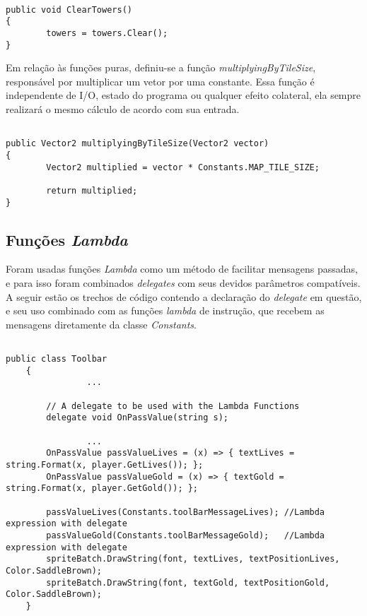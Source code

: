 \documentclass[rel_mlp]{iiufrgs}
\begin{document}
\begin{lstlisting}[caption=Trecho de código C\# retirado da implementação deste trabalho, label=lst:test]

public void ClearTowers()
{
		towers = towers.Clear();
}

\end{lstlisting}

Em relação às funções puras, definiu-se a função \textit{multiplyingByTileSize}, responsável por multiplicar um vetor por uma constante. Essa função é independente de I/O, estado do programa ou qualquer efeito colateral, ela sempre realizará o mesmo cálculo de acordo com sua entrada.

\begin{lstlisting}[caption=Trecho de código C\# retirado da implementação deste trabalho, label=lst:test]

public Vector2 multiplyingByTileSize(Vector2 vector)
{
		Vector2 multiplied = vector * Constants.MAP_TILE_SIZE;

		return multiplied;
}

\end{lstlisting}

\subsection{Funções \textit{Lambda}}

	Foram usadas funções \textit{Lambda} como um método de facilitar mensagens passadas, e para isso foram combinados \textit{delegates} com seus devidos parâmetros compatíveis. A seguir estão os trechos de código contendo a declaração do \textit{delegate} em questão, e seu uso combinado com as funções \textit{lambda} de instrução, que recebem as mensagens diretamente da classe \textit{Constants}.
		
\begin{lstlisting}[caption=Trecho de código C\# retirado da implementação deste trabalho, label=lst:test]
	
public class Toolbar
    {
				...
		
        // A delegate to be used with the Lambda Functions
        delegate void OnPassValue(string s);
				
				...
        OnPassValue passValueLives = (x) => { textLives = string.Format(x, player.GetLives()); };
        OnPassValue passValueGold = (x) => { textGold = string.Format(x, player.GetGold()); };

        passValueLives(Constants.toolBarMessageLives); //Lambda expression with delegate
        passValueGold(Constants.toolBarMessageGold);   //Lambda expression with delegate
        spriteBatch.DrawString(font, textLives, textPositionLives, Color.SaddleBrown);
        spriteBatch.DrawString(font, textGold, textPositionGold, Color.SaddleBrown);
    }


\end{lstlisting}
\end{document}
